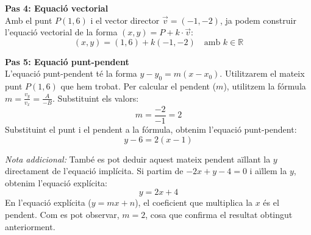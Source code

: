 \documentclass[12pt,a4paper]{article}
\begin{document}
\vspace{0.3cm}
\textbf{Pas 4: Equació vectorial} \\
Amb el punt $P(1, 6)$ i el vector director $\vec{v} = (-1, -2)$, ja podem construir l'equació vectorial de la forma $(x, y) = P + k \cdot \vec{v}$:
\begin{equation*}
    (x, y) = (1, 6) + k(-1, -2) \quad \text{amb } k \in \mathbb{R}
\end{equation*}

\vspace{0.3cm}
\textbf{Pas 5: Equació punt-pendent} \\
L'equació punt-pendent té la forma $y - y_0 = m(x - x_0)$. Utilitzarem el mateix punt $P(1, 6)$ que hem trobat. 
Per calcular el pendent ($m$), utilitzem la fórmula $m = \frac{v_y}{v_x} = \frac{A}{-B}$. Substituint els valors:
\begin{equation*}
    m = \frac{-2}{-1} = 2
\end{equation*}
Substituint el punt i el pendent a la fórmula, obtenim l'equació punt-pendent:
\begin{equation*}
    y - 6 = 2(x - 1)
\end{equation*}

\vspace{0.3cm}
\textit{Nota addicional:} També es pot deduir aquest mateix pendent aïllant la $y$ directament de l'equació implícita. Si partim de $-2x + y - 4 = 0$ i aïllem la $y$, obtenim l'equació explícita:
\begin{equation*}
    y = 2x + 4
\end{equation*}
En l'equació explícita ($y = mx + n$), el coeficient que multiplica la $x$ és el pendent. Com es pot observar, $m = 2$, cosa que confirma el resultat obtingut anteriorment.
\end{document}
